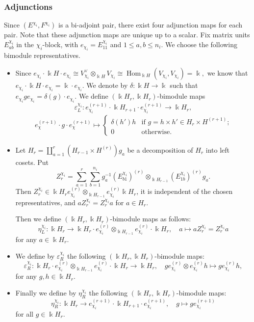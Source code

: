 \documentclass[12pt]{amsart}
\numberwithin{itemcounter}{subsection}
\theoremstyle{plain}
\theoremstyle{definition}
\theoremstyle{remark}
\numberwithin{equation}{section}
\def\k{\Bbbk}
\def\Hom{\operatorname{Hom}\nolimits}
\def\Hom{\operatorname{Hom}}
\begin{document}
\subsubsection{Adjunctions}
\label{sec:adjwreath}
Since $(E^{\chi_i},F^{\chi_i})$ is a bi-adjoint pair, there exist four adjunction maps for each pair. Note that these adjunction maps are unique up to a scalar.
Fix matrix units $E^{\chi_i}_{ab}$ in the $\chi_i$-block, with
$e_{\chi_i}=E^{\chi_i}_{11}$ and $1\leq a,b\leq n_i$.  We choose the
following bimodule representatives.
\begin{itemize}
	\item[$(a)$]
	Since $ e_{\chi_i}\cdot \k H  \cdot e_{\chi_i}\cong V^\vee_{\chi_i}\otimes_{\k H } V_{\chi_i}\cong  \Hom_{\k H }(V_{\chi_i},V_{\chi_i})=\k,$ we know that $e_{\chi_i}\cdot \k H  \cdot e_{\chi_i}=\k\cdot e_{\chi_i}.$ We denote by $\delta: \k H  \to \k$  such that $e_{\chi_i}g e_{\chi_i}=\delta(g)\cdot e_{\chi_i}$.
	We define  $(\k H  _{r},\k H  _{r})$-bimodule
	maps
	$$\varepsilon^{\chi_i}_L: e^{(r+1)}_{\chi_i}\cdot \k H  _{r+1}\cdot e^{(r+1)}_{\chi_i} \to  \k H  _r,$$
	\begin{align*}
		e^{(r+1)}_{\chi}\cdot g\cdot e^{(r+1)}_{\chi}\mapsto
		\begin{cases}
			\delta(h')h &\text{if $g=h\times h' \in H_r\times H^{(r+1)}$;}\\
			0&\text{otherwise.}
		\end{cases}
	\end{align*}

	\item[$(b)$]
	Let $H_r=\coprod_{a=1}^{r}(H_{r-1}\times H^{(r)})g_a$ be a decomposition
	of $H_r$ into left cosets.  Put
	\[
	Z^{\chi_i}_r=\sum_{a=1}^{r}\sum_{b=1}^{n_i}
	g_a^{-1}(E^{\chi_i}_{b1})^{(r)}\otimes_{\k H_{r-1}}
	(E^{\chi_i}_{1b})^{(r)}g_a.
	\]
	Then $Z^{\chi_i}_r\in \k H_r e^{(r)}_{\chi_i}\otimes_{\k H_{r-1}}
	e^{(r)}_{\chi_i}\k H_r$, it is independent of the chosen representatives,
	and $aZ^{\chi_i}_r=Z^{\chi_i}_ra$ for $a\in H_r$.
	\smallskip

	Then we define $( \k H _r , \k H _r )$-bimodule maps as follows:
	$$\eta^{\chi_i}_L: \k H _r \to  \k H _{r}\cdot e^{(r)}_{\chi_i}\otimes_{\k H _{r-1}} e^{(r)}_{\chi_i}\cdot \k H _r  ,\quad a\mapsto aZ_r^{\chi_i}=Z^{\chi_i}_ra$$
	for any $a\in  \k H _r .$

	\item[$(c)$]

	We define by $\varepsilon^{\chi_i}_R$ the following $( \k H _r , \k H _r )$-bimodule maps:
	$$\varepsilon^{\chi_i}_R: \k H _{r}\cdot e^{(r)}_{\chi_i}\otimes_{\k H _{r-1}} e^{(r)}_{\chi_i}\cdot \k H _r  \to  \k H _r ,\quad g  e^{(r)}_{\chi_i} \otimes e^{(r)}_{\chi_i} h\mapsto g e^{(r)}_{\chi_i} h,$$
	for any $g,h\in  \k H _r $.
	\item[$(d)$] Finally we define by $\eta^{\chi_i}_R$  the following $( \k H _r , \k H _r )$-bimodule maps:
	$$\eta^{\chi_i}_R:  \k H _r \to  e^{(r+1)}_{\chi_i}\cdot \k H _{r+1}\cdot e^{(r+1)}_{\chi_i} ,\quad g\mapsto  g e^{(r+1)}_{\chi_i} $$
	for all $g\in  \k H _r .$
\end{itemize}
\end{document}
